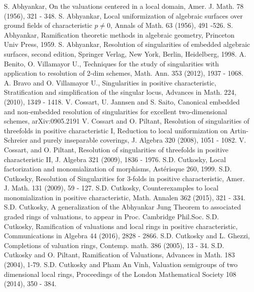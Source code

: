 \documentclass[11pt]{amsart}
\begin{document}
  
\begin{thebibliography}{1000000000}
 S. Abhyankar, On the valuations centered in a local domain, Amer. J. Math. 78 (1956), 321 - 348.
 S. Abhyankar, Local uniformization of algebraic surfaces over ground fields of characteristic $p\ne 0$, Annals of Math. 63 (1956), 491 -526.
 S. Abhyankar, Ramification theoretic methods in algebraic geometry, Princeton Univ Press, 1959.
 S. Abhyankar, Resolution of singularities of embedded algebraic surfaces, second edition, Springer Verlag, New York, Berlin, Heidelberg, 1998. 
 A. Benito, O. Villamayor U., Techniques for the study of singularities with application to resolution of 2-dim schemes, Math. Ann. 353 (2012), 1937 - 1068.
 A. Bravo and O. Villamayor U., Singularities in positive characteristic, Stratification and simplification of the singular locus, Advances in Math. 224, (2010), 1349 - 1418.
 V. Cossart, U. Jannsen and S. Saito, Canonical embedded and non-embedded resolution of singularities for excellent two-dimensional schemes, arXiv:0905.2191
 V. Cossart and O.  Piltant,   Resolution of singularities of threefolds in positive characteristic I, Reduction to local uniformization on Artin-Schreier and purely inseparable coverings, J. Algebra 320 (2008), 1051 - 1082.
 V. Cossart, and O. Piltant,  Resolution of singularities of threefolds in positive characteristic II, J. Algebra 321 (2009), 1836 - 1976.
 S.D. Cutkosky, Local factorization and monomialization of morphisms, Ast\'erisque
260, 1999.
 S.D. Cutkosky, Resolution of Singularities for 3-folds in positive characteristic, Amer. J. Math. 131 (2009), 59 - 127.
 S.D. Cutkosky, Counterexamples to local monomialization in positive characteristic, Math. Annalen 362 (2015), 321 - 334.
 S.D. Cutkosky, A generalization of the Abhyankar Jung Theorem to associated graded rings of valuations, to appear in  Proc. Cambridge Phil.Soc.
 S.D. Cutkosky, Ramification of valuations and local rings in positive characteristic,  Communications in Algebra 44 (2016), 2828 - 2866. 
 S.D. Cutkosky and L. Ghezzi,  Completions of valuation rings,
Contemp. math. 386 (2005), 13 - 34.
 S.D. Cutkosky and O. Piltant, Ramification of Valuations, Advances in Math. 183 (2004), 1-79.
 S.D. Cutkosky and Pham An Vinh, Valuation semigroups of two dimensional  local rings, Proceedings of the London Mathematical Society 108 (2014), 350 - 384.

\end{thebibliography}
\end{document}
